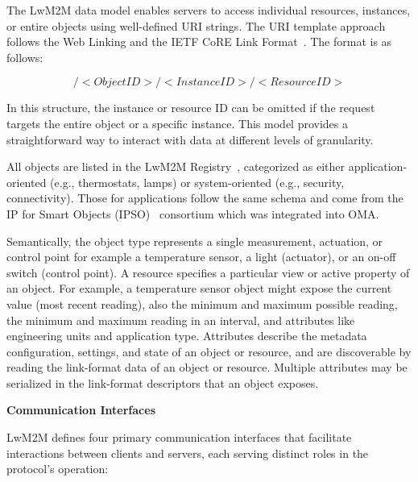 \documentclass[11pt,sigconf]{iabart}
\begin{document}
The LwM2M data model enables servers to access individual resources, instances, or entire objects using well-defined URI strings. The URI template approach follows the Web Linking and the IETF CoRE Link Format~\cite{rfc6690}. The format is as follows:

\[
/<Object ID>/<Instance ID>/<Resource ID>
\]

In this structure, the instance or resource ID can be omitted if the request targets the entire object or a specific instance. This model provides a straightforward way to interact with data at different levels of granularity.

All objects are listed in the LwM2M Registry~\cite{lwm2m-registry}, categorized as either application-oriented (e.g., thermostats, lamps) or system-oriented (e.g., security, connectivity). Those for applications follow the same schema and come from the IP for Smart Objects (IPSO)~\cite{ipso} consortium which was integrated into OMA. 

Semantically, the object type represents a single measurement, actuation, or control point for example a temperature sensor, a light (actuator), or an on-off switch (control point). A resource specifies a particular view or active property of an object. For example, a temperature sensor object might expose the current value (most recent reading), also the minimum and maximum possible reading, the minimum and maximum reading in an interval, and attributes like engineering units and application type. Attributes describe the metadata configuration, settings, and state of an object or resource, and are discoverable by reading the link-format data of an object or resource. Multiple attributes may be serialized in the link-format descriptors that an object exposes.

\textbf{Communication Interfaces}

LwM2M defines four primary communication interfaces that facilitate interactions between clients and servers, each serving distinct roles in the protocol's operation:
\end{document}
